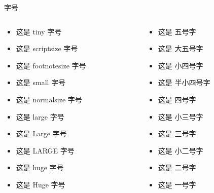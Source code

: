 \documentclass[aspectratio=169]{beamer}
\begin{document}
\begin{frame}{字号}
    \vspace{-1.8em}
    \begin{columns}[t]  %
        \begin{column}{0.5\textwidth}
            \begin{itemize}
                \item {\tiny 这是 tiny 字号}
                \item {\scriptsize 这是 scriptsize 字号}
                \item {\footnotesize 这是 footnotesize 字号}
                \item {\small 这是 small 字号}
                \item {\normalsize 这是 normalsize 字号}
                \item {\large 这是 large 字号}
                \item {\Large 这是 Large 字号}
                \item {\LARGE 这是 LARGE 字号}
                \item {\huge 这是 huge 字号}
                \item {\Huge 这是 Huge 字号}
            \end{itemize}
        \end{column}
        \begin{column}{0.5\textwidth}
            \begin{itemize}
                \item {\wuhao 这是 五号字}
                \item {\dawuhao 这是 大五号字}
                \item {\xiaosi 这是 小四号字}
                \item {\banxiaosi 这是 半小四号字}
                \item {\sihao 这是 四号字}
                \item {\xiaosan 这是 小三号字}
                \item {\sanhao 这是 三号字}
                \item {\xiaoer 这是 小二号字}
                \item {\erhao 这是 二号字}
                \item {\yihao 这是 一号字}
            \end{itemize}
        \end{column}
    \end{columns}
\end{frame}
\end{document}

